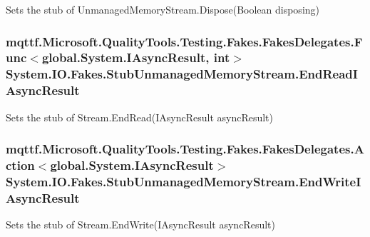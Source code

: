Sets the stub of Unmanaged\-Memory\-Stream.\-Dispose(\-Boolean disposing)

\hypertarget{class_system_1_1_i_o_1_1_fakes_1_1_stub_unmanaged_memory_stream_a0f6fda815551c6eedd783c4bf2667028}{
\subsubsection[{End\-Read\-I\-Async\-Result}]{\setlength{\rightskip}{0pt plus 5cm}mqttf.\-Microsoft.\-Quality\-Tools.\-Testing.\-Fakes.\-Fakes\-Delegates.\-Func$<$global.\-System.\-I\-Async\-Result, int$>$ System.\-I\-O.\-Fakes.\-Stub\-Unmanaged\-Memory\-Stream.\-End\-Read\-I\-Async\-Result}}\label{class_system_1_1_i_o_1_1_fakes_1_1_stub_unmanaged_memory_stream_a0f6fda815551c6eedd783c4bf2667028}


Sets the stub of Stream.\-End\-Read(\-I\-Async\-Result async\-Result)

\hypertarget{class_system_1_1_i_o_1_1_fakes_1_1_stub_unmanaged_memory_stream_a9dd9e748c765f979179a2acf8592bb6b}{
\subsubsection[{End\-Write\-I\-Async\-Result}]{\setlength{\rightskip}{0pt plus 5cm}mqttf.\-Microsoft.\-Quality\-Tools.\-Testing.\-Fakes.\-Fakes\-Delegates.\-Action$<$global.\-System.\-I\-Async\-Result$>$ System.\-I\-O.\-Fakes.\-Stub\-Unmanaged\-Memory\-Stream.\-End\-Write\-I\-Async\-Result}}\label{class_system_1_1_i_o_1_1_fakes_1_1_stub_unmanaged_memory_stream_a9dd9e748c765f979179a2acf8592bb6b}


Sets the stub of Stream.\-End\-Write(\-I\-Async\-Result async\-Result)

